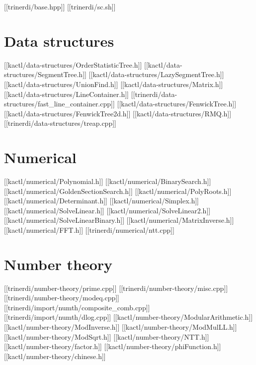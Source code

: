 

\dotoc

[[trinerdi/base.hpp]]
[[trinerdi/sc.sh]]

\chapter{Data structures}

[[kactl/data-structures/OrderStatisticTree.h]]
[[kactl/data-structures/SegmentTree.h]]
[[kactl/data-structures/LazySegmentTree.h]]
[[kactl/data-structures/UnionFind.h]]
[[kactl/data-structures/Matrix.h]]
[[kactl/data-structures/LineContainer.h]]
[[trinerdi/data-structures/fast_line_container.cpp]]
[[kactl/data-structures/FenwickTree.h]]
[[kactl/data-structures/FenwickTree2d.h]]
[[kactl/data-structures/RMQ.h]]
[[trinerdi/data-structures/treap.cpp]]

\chapter{Numerical}

[[kactl/numerical/Polynomial.h]]
[[kactl/numerical/BinarySearch.h]]
[[kactl/numerical/GoldenSectionSearch.h]]
[[kactl/numerical/PolyRoots.h]]
[[kactl/numerical/Determinant.h]]
[[kactl/numerical/Simplex.h]]
[[kactl/numerical/SolveLinear.h]]
[[kactl/numerical/SolveLinear2.h]]
[[kactl/numerical/SolveLinearBinary.h]]
[[kactl/numerical/MatrixInverse.h]]
[[kactl/numerical/FFT.h]]
[[trinerdi/numerical/ntt.cpp]]

\chapter{Number theory}
[[trinerdi/number-theory/prime.cpp]]
[[trinerdi/number-theory/misc.cpp]]
[[trinerdi/number-theory/modeq.cpp]]
[[trinerdi/import/numth/composite_comb.cpp]]
[[trinerdi/import/numth/dlog.cpp]]
[[kactl/number-theory/ModularArithmetic.h]]
[[kactl/number-theory/ModInverse.h]]
[[kactl/number-theory/ModMulLL.h]]
[[kactl/number-theory/ModSqrt.h]]
[[kactl/number-theory/NTT.h]]
[[kactl/number-theory/factor.h]]
[[kactl/number-theory/phiFunction.h]]
[[kactl/number-theory/chinese.h]]

